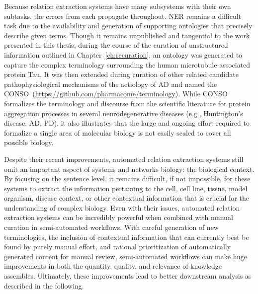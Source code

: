 Because relation extraction systems have many subsystems with their own subtasks, the errors from each propagate throughout.
\ac{NER} remains a difficult task due to the availability and generation of supporting ontologies that precisely describe given terms.
Though it remains unpublished and tangential to the work presented in this thesis, during the course of the curation of unstructured information outlined in Chapter~\ref{ch:recuration}, an ontology was generated to capture the complex terminology surrounding the human microtubule associated protein Tau.
It was then extended during curation of other related candidate pathophysiological mechanisms of the aetiology of \ac{AD} and named the \ac{CONSO}~(\url{https://github.com/pharmacome/terminology}).
While \ac{CONSO} formalizes the terminology and discourse from the scientific literature for protein aggregation processes in several neurodegenerative diseases (e.g., Huntington's disease, \ac{AD}, \ac{PD}), it also illustrates that the large and ongoing effort required to formalize a single area of molecular biology is not easily scaled to cover all possible biology.

Despite their recent improvements, automated relation extraction systems still omit an important aspect of systems and networks biology: the biological context.
By focusing on the sentence level, it remains difficult, if not impossible, for these systems to extract the information pertaining to the cell, cell line, tissue, model organism, disease context, or other contextual information that is crucial for the understanding of complex biology.
Even with their issues, automated relation extraction systems can be incredibly powerful when combined with manual curation in semi-automated workflows.
With careful generation of new terminologies, the inclusion of contextual information that can currently best be found by purely manual effort, and rational prioritization of automatically generated content for manual review, semi-automated workflows can make huge improvements in both the quantity, quality, and relevance of knowledge assembles.
Ultimately, these improvements lead to better downstream analysis as described in the following.
